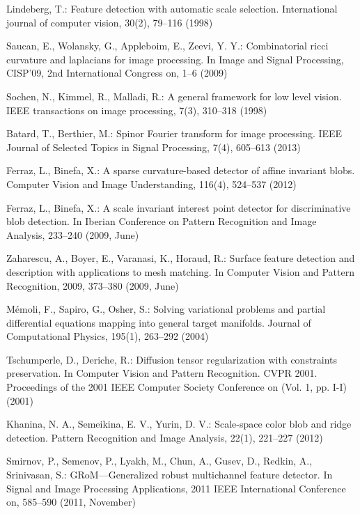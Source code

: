 \documentclass{llncs}
\begin{document}
\begin{thebibliography}{16}
%
Lindeberg, T.:
Feature detection with automatic scale selection. 
International journal of computer vision, 30(2), 79--116 (1998)

Saucan, E., Wolansky, G., Appleboim, E., Zeevi, Y. Y.:
Combinatorial ricci curvature and laplacians for image processing. 
In Image and Signal Processing, CISP'09, 2nd International Congress on, 1--6 (2009)

Sochen, N., Kimmel, R., Malladi, R.: 
A general framework for low level vision. 
IEEE transactions on image processing, 7(3), 310--318 (1998)

Batard, T., Berthier, M.:
Spinor Fourier transform for image processing. 
IEEE Journal of Selected Topics in Signal Processing, 7(4), 605--613 (2013)

Ferraz, L., Binefa, X.:
A sparse curvature-based detector of affine invariant blobs. 
Computer Vision and Image Understanding, 116(4), 524--537 (2012)

Ferraz, L., Binefa, X.:
A scale invariant interest point detector for discriminative blob detection. 
In Iberian Conference on Pattern Recognition and Image Analysis, 233--240  (2009, June)

Zaharescu, A., Boyer, E., Varanasi, K., Horaud, R.:
Surface feature detection and description with applications to mesh matching. 
In Computer Vision and Pattern Recognition, 2009, 373--380 (2009, June)

Mémoli, F., Sapiro, G., Osher, S.:
Solving variational problems and partial differential equations mapping into general target manifolds. 
Journal of Computational Physics, 195(1), 263--292 (2004)

Tschumperle, D., Deriche, R.:
Diffusion tensor regularization with constraints preservation. 
In Computer Vision and Pattern Recognition. CVPR 2001. Proceedings of the 2001 IEEE Computer Society Conference on (Vol. 1, pp. I-I) (2001)


Khanina, N. A., Semeikina, E. V., Yurin, D. V.:
Scale-space color blob and ridge detection. 
Pattern Recognition and Image Analysis, 22(1), 221--227 (2012)

Smirnov, P., Semenov, P., Lyakh, M., Chun, A., Gusev, D., Redkin, A., Srinivasan, S.:
GRoM—Generalized robust multichannel feature detector. 
In Signal and Image Processing Applications, 2011 IEEE International Conference on, 585--590 (2011, November)


\end{thebibliography}
\end{document}
